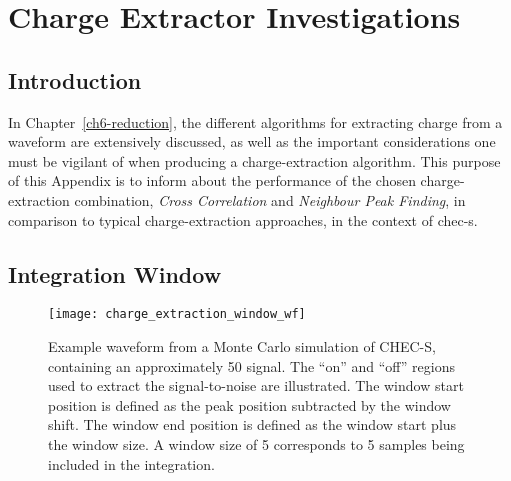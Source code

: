 \chapter{\label{a3-extractors}Charge Extractor Investigations}

\minitoc

\section{Introduction}

In Chapter~\ref{ch6-reduction}, the different algorithms for extracting charge from a waveform are extensively discussed, as well as the important considerations one must be vigilant of when producing a charge-extraction algorithm. This purpose of this Appendix is to inform about the performance of the chosen charge-extraction combination, \textit{Cross Correlation} and \textit{Neighbour Peak Finding}, in comparison to typical charge-extraction approaches, in the context of \gls{chec-s}.

\section{Integration Window}

\begin{figure}
  \texttt{[image: charge\_extraction\_window\_wf]}
  \caption[Definition of integration window on a waveform.]{Example waveform from a Monte Carlo simulation of CHEC-S, containing an approximately \SI{50}{\pe} signal. The ``on'' and ``off'' regions used to extract the signal-to-noise are illustrated. The window start position is defined as the peak position subtracted by the window shift. The window end position is defined as the window start plus the window size. A window size of 5 corresponds to 5 samples being included in the integration.}
  \label{fig:charge_extraction_window_wf}
\end{figure}

